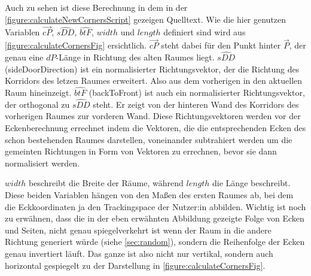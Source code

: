 Auch zu sehen ist diese Berechnung in dem in der \autoref{figure:calculateNewCornersScript} gezeigen Quelltext.
Wie die hier genutzen Variablen $\vec{cP}$, $\hat{sDD}$, $\hat{btF}$, $width$ und $length$ definiert sind wird aus \autoref{figure:calculateCornersFig} ersichtlich. %
$\vec{cP}$ steht dabei für den Punkt hinter $\vec{P}$, der genau eine $dP$-Länge in Richtung des alten Raumes liegt. $\hat{sDD}$ (sideDoorDirection) ist ein normalisierter Richtungsvektor,
der die Richtung des Korridors des letzen Raumes erweitert. Also aus dem vorherigen in den aktuellen Raum hineinzeigt.
$\hat{btF}$ (backToFront) ist auch ein normalisierter Richtungsvektor, der orthogonal zu $\hat{sDD}$ steht.
Er zeigt von der hinteren Wand des Korridors des vorherigen Raumes zur vorderen Wand.
Diese Richtungsvektoren werden vor der Eckenberechnung errechnet indem die Vektoren, die die entsprechenden Ecken des schon bestehenden Raumes darstellen, voneinander subtrahiert werden um die gemeinten Richtungen in Form von Vektoren zu errechnen, bevor sie dann normalisiert werden.

$width$ beschreibt die Breite der Räume, während $length$ die Länge beschreibt. Diese beiden Variablen hängen von den Maßen des ersten Raumes ab, bei dem die Eckkoordinaten ja den Trackingspace der Nutzer:in abbilden. Wichtig ist noch zu erwähnen, dass die in der eben erwähnten Abbildung gezeigte Folge von Ecken und Seiten, nicht genau spiegelverkehrt ist wenn der Raum in die andere Richtung generiert würde (siehe \autoref{sec:random}), sondern die Reihenfolge der Ecken genau invertiert läuft. Das ganze ist also nicht nur vertikal, sondern auch horizontal gespiegelt zu der Darstellung in \autoref{figure:calculateCornersFig}.

